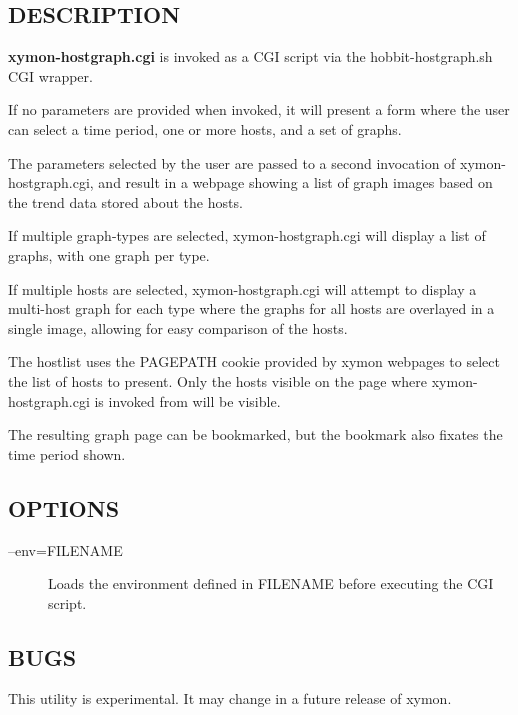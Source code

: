 \subsection{DESCRIPTION}
\textbf{xymon-hostgraph.cgi} is invoked as a CGI script via the hobbit-hostgraph.sh CGI wrapper. 

  If no parameters are provided when invoked, it will present a form
  where the user can select a time period, one or more hosts, and a
  set of graphs. 



  The parameters selected by the user are passed to a second
  invocation of xymon-hostgraph.cgi, and result in a webpage showing
  a list of graph images based on the trend data stored about the
  hosts. 



  If multiple graph-types are selected, xymon-hostgraph.cgi will display a list of graphs, with one graph per type. 


  If multiple hosts are selected, xymon-hostgraph.cgi will attempt to
  display a multi-host graph for each type where the graphs for all
  hosts are overlayed in a single image, allowing for easy comparison
  of the hosts. 



  The hostlist uses the PAGEPATH cookie provided by xymon webpages to
  select the list of hosts to present. Only the hosts visible on the
  page where xymon-hostgraph.cgi is invoked from will be visible. 



  The resulting graph page can be bookmarked, but the bookmark also fixates the time period shown. 


 
\subsection{OPTIONS}
\begin{description}
\item[--env=FILENAME] Loads the environment defined in FILENAME before executing the CGI script. 

 


\end{description}
\subsection{BUGS}
 This utility is experimental. It may change in a future release of xymon. 

